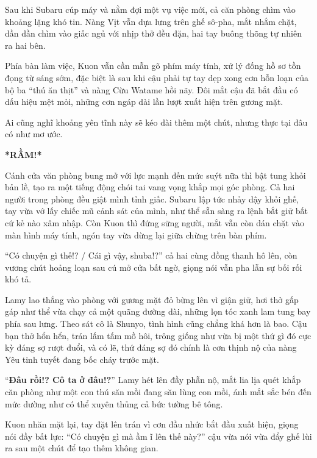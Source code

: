 \documentclass[../main.tex]{subfiles}
\begin{document}
\omk

Sau khi Subaru cúp máy và nằm đợi một vụ việc mới, cả căn phòng chìm vào khoảng lặng khó tin. Nàng Vịt vẫn dựa lưng trên ghế sô-pha, mắt nhắm chặt, dần dần chìm vào giấc ngủ với nhịp thở đều đặn, hai tay buông thõng tự nhiên ra hai bên.

Phía bàn làm việc, Kuon vẫn cần mẫn gõ phím máy tính, xử lý đống hồ sơ tồn đọng từ sáng sớm, đặc biệt là sau khi cậu phải tự tay dẹp xong cơn hỗn loạn của bộ ba ``thú ăn thịt'' và nàng Cừu Watame hồi nãy. Đôi mắt cậu đã bắt đầu có dấu hiệu mệt mỏi, những cơn ngáp dài lần lượt xuất hiện trên gương mặt.

Ai cũng nghĩ khoảng yên tĩnh này sẽ kéo dài thêm một chút, nhưng thực tại đâu có như mơ ước.

\textbf{*RẦM!*}

Cánh cửa văn phòng bung mở với lực mạnh đến mức suýt nữa thì bật tung khỏi bản lề, tạo ra một tiếng động chói tai vang vọng khắp mọi góc phòng. Cả hai người trong phòng đều giật mình tỉnh giấc. Subaru lập tức nhảy dậy khỏi ghế, tay vừa vớ lấy chiếc mũ cảnh sát của mình, như thể sẵn sàng ra lệnh bắt giữ bất cứ kẻ nào xâm nhập. Còn Kuon thì đứng sững người, mắt vẫn còn dán chặt vào màn hình máy tính, ngón tay vừa dừng lại giữa chừng trên bàn phím.

``Có chuyện gì thế!? / Cái gì vậy, shuba!?'' cả hai cùng đồng thanh hô lên, còn vương chút hoảng loạn sau cú mở cửa bất ngờ, giọng nói vẫn pha lẫn sự bối rối khó tả.

Lamy lao thẳng vào phòng với gương mặt đỏ bừng lên vì giận giữ, hơi thở gấp gáp như thể vừa chạy cả một quãng đường dài, những lọn tóc xanh lam tung bay phía sau lưng. Theo sát cô là Shunyo, tình hình cũng chẳng khá hơn là bao. Cậu bạn thở hổn hển, trán lấm tấm mồ hôi, trông giống như vừa bị một thứ gì đó cực kỳ đáng sợ rượt đuổi, và có lẽ, thứ đáng sợ đó chính là cơn thịnh nộ của nàng Yêu tinh tuyết đang bốc cháy trước mặt.

``\textbf{Đâu rồi!? Cô ta ở đâu!?}'' Lamy hét lên đầy phẫn nộ, mắt lia lịa quét khắp căn phòng như một con thú săn mồi đang săn lùng con mồi, ánh mắt sắc bén đến mức dường như có thể xuyên thủng cả bức tường bê tông.

Kuon nhăn mặt lại, tay đặt lên trán vì cơn đầu nhức bắt đầu xuất hiện, giọng nói đầy bất lực: ``Có chuyện gì mà ầm ĩ lên thế này?'' cậu vừa nói vừa đẩy ghế lùi ra sau một chút để tạo thêm không gian.
\end{document}
